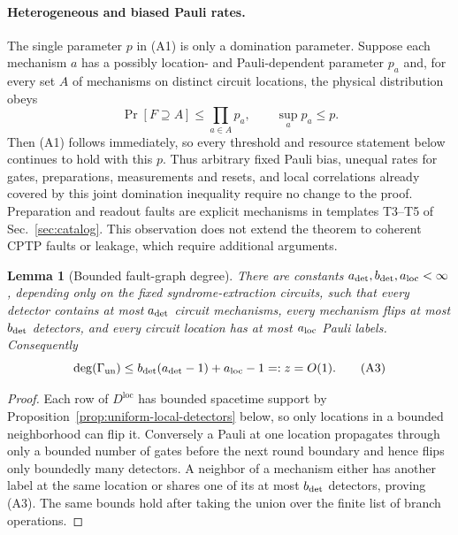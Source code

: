 \documentclass[aps,prx,reprint,superscriptaddress,nofootinbib,floatfix,longbibliography]{revtex4-2}
\newtheorem{lemma}[theorem]{Lemma}
\theoremstyle{definition}
\begin{document}
\paragraph{Heterogeneous and biased Pauli rates.}
The single parameter $p$ in (A1) is only a domination parameter.  Suppose each
mechanism $a$ has a possibly location- and Pauli-dependent parameter $p_a$ and,
for every set $A$ of mechanisms on distinct circuit locations, the physical
distribution obeys
\begin{equation*}
 \Pr[F\supseteq A]\leq\prod_{a\in A}p_a,
 \qquad \sup_a p_a\leq p.
\end{equation*}
Then (A1) follows immediately, so every threshold and resource statement below
continues to hold with this $p$.  Thus arbitrary fixed Pauli bias, unequal
rates for gates, preparations, measurements and resets, and local correlations
already covered by this joint domination inequality require no change to the
proof.  Preparation and readout faults are explicit mechanisms in templates
T3--T5 of Sec.~\ref{sec:catalog}.  This observation does not extend the theorem to coherent CPTP faults
or leakage, which require additional arguments.

\begin{lemma}[Bounded fault-graph degree]\label{lem:A2}
There are constants $a_{\rm det},b_{\rm det},a_{\rm loc}<\infty$,
depending only on the fixed syndrome-extraction circuits, such that every
detector contains at most $a_{\rm det}$ circuit mechanisms, every mechanism
flips at most $b_{\rm det}$ detectors, and every circuit location has at most
$a_{\rm loc}$ Pauli labels.  Consequently
\begin{equation}
 \deg(\Gamma_{\rm un})
 \leq b_{\rm det}(a_{\rm det}-1)+a_{\rm loc}-1=:z=O(1).             \tag{A3}
\end{equation}
\end{lemma}
\begin{proof}
Each row of $D^{\mathrm{loc}}$ has bounded spacetime support by
Proposition~\ref{prop:uniform-local-detectors} below, so only locations in a
bounded neighborhood can flip it.  Conversely a Pauli at one
location propagates through only a bounded number of gates before the next
round boundary and hence flips only boundedly many detectors.  A neighbor of
a mechanism either has another label at the same location or shares one of
its at most $b_{\rm det}$ detectors, proving (A3).  The same bounds hold after
taking the union over the finite list of branch operations.
\end{proof}
\end{document}
